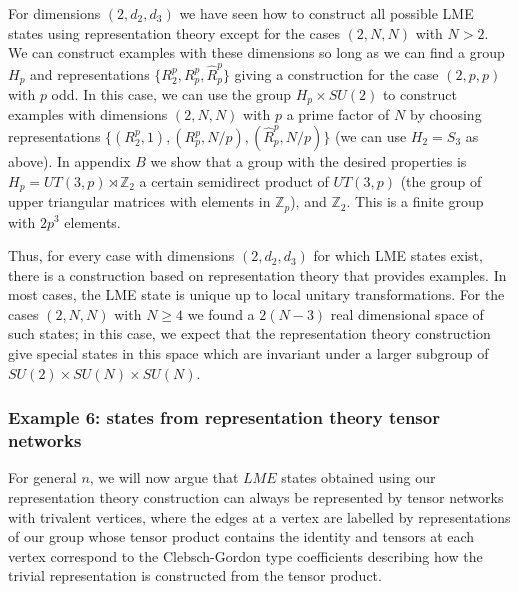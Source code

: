 \documentclass[12pt]{article}
\theoremstyle{definition}
\begin{document}
For dimensions $(2,d_2,d_3)$ we have seen how to construct all possible LME states using representation theory except for the cases $(2,N,N)$ with $N > 2$. We can construct examples with these dimensions so long as we can find a group $H_p$ and representations $\{R^p_2, R_p^p,\hat{R}_p^p\}$ giving a construction for the case $(2,p,p)$ with $p$ odd. In this case, we can use the group $H_p \times SU(2)$ to construct examples with dimensions $(2,N,N)$ with $p$ a prime factor of $N$ by choosing representations $\{(R^p_2,1), (R_p^p,N/p),(\hat{R}_p^p,N/p)\}$ (we can use $H_2 = S_3$ as above). In appendix $B$ we show that a group with the desired properties is $H_p = UT(3,p) \rtimes \mathbb{Z}_2$ a certain semidirect product of $UT(3,p)$ (the group of upper triangular matrices with elements in $\mathbb{Z}_p$), and $\mathbb{Z}_2$. This is a finite group with $2p^3$ elements.

Thus, for every case with dimensions $(2,d_2,d_3)$ for which LME states exist, there is a construction based on representation theory that provides examples. In most cases, the LME state is unique up to local unitary transformations. For the cases $(2,N,N)$ with $N \ge 4$ we found a $2(N-3)$ real dimensional space of such states; in this case, we expect that the representation theory construction give special states in this space which are invariant under a larger subgroup of $SU(2) \times SU(N) \times SU(N)$.

\subsubsection*{Example 6: states from representation theory tensor networks}

For general $n$, we will now argue that $LME$ states obtained using our representation theory construction can always be represented by tensor networks with trivalent vertices, where the edges at a vertex are labelled by representations of our group whose tensor product contains the identity and tensors at each vertex correspond to the Clebsch-Gordon type coefficients describing how the trivial representation is constructed from the tensor product.
\end{document}
